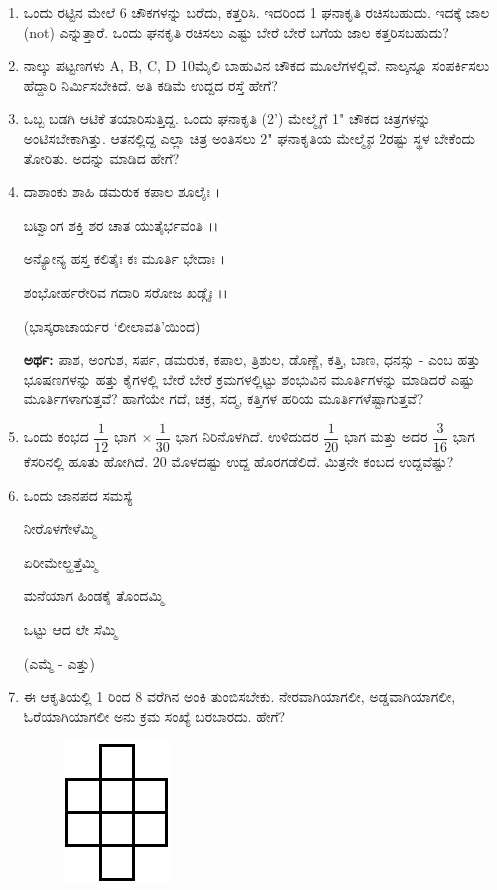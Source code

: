 \begin{enumerate}
\item ಒಂದು ರಟ್ಟಿನ ಮೇಲೆ 6 ಚೌಕಗಳನ್ನು ಬರೆದು, ಕತ್ತರಿಸಿ. ಇದರಿಂದ 1 ಘನಾಕೃತಿ ರಚಿಸಬಹುದು. ಇದಕ್ಕೆ ಜಾಲ (not) ಎನ್ನುತ್ತಾರೆ. ಒಂದು ಘನಕೃತಿ ರಚಿಸಲು ಎಷ್ಟು ಬೇರೆ ಬೇರೆ ಬಗೆಯ ಜಾಲ ಕತ್ತರಿಸಬಹುದು?

\item ನಾಲ್ಕು ಪಟ್ಟಣಗಳು A, B, C, D 10ಮೈಲಿ ಬಾಹುವಿನ ಚೌಕದ ಮೂಲೆಗಳಲ್ಲಿವೆ. ನಾಲ್ಕನ್ನೂ ಸಂಪರ್ಕಿಸಲು ಹೆದ್ದಾರಿ ನಿರ್ಮಿಸಬೇಕಿದೆ. ಅತಿ ಕಡಿಮೆ ಉದ್ದದ ರಸ್ತೆ ಹೇಗೆ?

\item ಒಬ್ಬ ಬಡಗಿ ಆಟಿಕೆ ತಯಾರಿಸುತ್ತಿದ್ದ. ಒಂದು ಘನಾಕೃತಿ (2') ಮೇಲ್ಮೈಗೆ 1" ಚೌಕದ ಚಿತ್ರಗಳನ್ನು ಅಂಟಿಸಬೇಕಾಗಿತ್ತು. ಆತನಲ್ಲಿದ್ದ ಎಲ್ಲಾ ಚಿತ್ರ ಅಂತಿಸಲು 2" ಘನಾಕೃತಿಯ ಮೇಲ್ಮೈನ 2ರಷ್ಟು ಸ್ಥಳ ಬೇಕೆಂದು ತೋರಿತು. ಅದನ್ನು ಮಾಡಿದ ಹೇಗೆ?

\item ದಾಶಾಂಕು ಶಾಹಿ ಡಮರುಕ ಕಪಾಲ ಶೂಲೈಃ ।

ಬಟ್ವಾಂಗ ಶಕ್ತಿ ಶರ ಚಾತ ಯುತೈರ್ಭವಂತಿ ।।

ಅನ್ಯೋನ್ಯ ಹಸ್ತ ಕಲಿತೈಃ ಕಃ ಮೂರ್ತಿ ಭೇದಾಃ ।

ಶಂಭೋರ್ಹರೇರಿವ ಗದಾರಿ ಸರೋಜ ಖಡ್ಗೈಃ ।।

\hfill (ಭಾಸ್ಕರಾಚಾರ್ಯರ ‘ಲೀಲಾವತಿ’ಯಿಂದ)

{\bf ಅರ್ಥ:} ಪಾಶ, ಅಂಗುಶ, ಸರ್ಪ, ಡಮರುಕ, ಕಪಾಲ, ತ್ರಿಶುಲ, ಡೊಣ್ಣೆ, ಕತ್ತಿ, ಬಾಣ, ಧನಸ್ಸು - ಎಂಬ ಹತ್ತು ಭೂಷಣಗಳನ್ನು ಹತ್ತು ಕೈಗಳಲ್ಲಿ ಬೇರೆ ಬೇರೆ ಕ್ರಮಗಳಲ್ಲಿಟ್ಟು ಶಂಭುವಿನ ಮೂರ್ತಿಗಳನ್ನು ಮಾಡಿದರೆ ಎಷ್ಟು ಮೂರ್ತಿಗಳಾಗುತ್ತವೆ? ಹಾಗೆಯೇ ಗದೆ, ಚಕ್ರ, ಸದ್ಮ, ಕತ್ತಿಗಳ ಹರಿಯ ಮೂರ್ತಿಗಳೆಷ್ಟಾಗುತ್ತವೆ?

\item ಒಂದು ಕಂಭದ $\dfrac{1}{12} \text{ ಭಾಗ}~ \times \dfrac{1}{30}$ ಭಾಗ ನಿರಿನೊಳಗಿದೆ. ಉಳಿದುದರ $\dfrac{1}{20}$ ಭಾಗ ಮತ್ತು ಅದರ $\dfrac{3}{16}$ ಭಾಗ ಕೆಸರಿನಲ್ಲಿ ಹೂತು ಹೋಗಿದೆ. 20 ಮೊಳದಷ್ಟು ಉದ್ದ ಹೊರಗಡೆಲಿದೆ. ಮಿತ್ರನೇ ಕಂಬದ ಉದ್ದವೆಷ್ಟು?

\item ಒಂದು ಜಾನಪದ ಸಮಸ್ಯೆ 

ನೀರೊಳಗೇಳೆಮ್ಮಿ 

ಏರೀಮೇಲ್ಹತ್ತೆಮ್ಮಿ 

ಮನೆಯಾಗ ಹಿಂಡಕೈ ತೊಂದಮ್ಮಿ 

ಒಟ್ಟು ಆದ ಲೇ ಸೆಮ್ಮಿ 

(ಎಮ್ಮೆ - ಎತ್ತು)

\item ಈ ಆಕೃತಿಯಲ್ಲಿ 1 ರಿಂದ 8 ವರೆಗಿನ ಅಂಕಿ ತುಂಬಿಸಬೇಕು. ನೇರವಾಗಿಯಾಗಲೀ, ಅಡ್ಡವಾಗಿಯಾಗಲೀ, ಓರೆಯಾಗಿಯಾಗಲೀ ಅನು ಕ್ರಮ ಸಂಖ್ಯೆ ಬರಬಾರದು. ಹೇಗೆ?

\begin{figure}[H]
\centering
\includegraphics{images/chap3/q28.eps}
\end{figure}


\end{enumerate}
